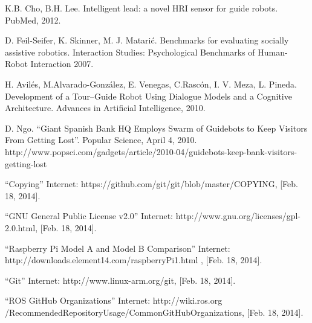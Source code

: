 \documentclass[11pt]{report}
\begin{document}
\begin{thebibliography}{99}

 K.B. Cho, B.H. Lee. Intelligent lead: a novel HRI sensor for guide robots. PubMed, 2012.

 D. Feil-Seifer, K. Skinner, M. J. Matarić. Benchmarks for evaluating socially assistive robotics. Interaction Studies: Psychological Benchmarks of Human-Robot Interaction 2007.

 H. Avilés, M.Alvarado-González, E. Venegas, C.Rascón, I. V. Meza, L. Pineda. Development of a Tour–Guide Robot Using Dialogue Models and a Cognitive Architecture. Advances in Artificial Intelligence, 2010.

 D. Ngo. “Giant Spanish Bank HQ Employs Swarm of Guidebots to Keep Visitors From Getting Lost”. Popular Science, April 4, 2010. http://www.popsci.com/gadgets/article/2010-04/guidebots-keep-bank-visitors-getting-lost

 “Copying” Internet: https://github.com/git/git/blob/master/COPYING, [Feb. 18, 2014].

 “GNU General Public License v2.0” Internet: http://www.gnu.org/licenses/gpl-2.0.html, [Feb. 18, 2014].

 “Raspberry Pi Model A and Model B Comparison” Internet: http://downloads.element14.com/raspberryPi1.html , [Feb. 18, 2014].

 “Git” Internet: http://www.linux-arm.org/git, [Feb. 18, 2014].

 “ROS GitHub Organizations” Internet: http://wiki.ros.org /RecommendedRepositoryUsage/CommonGitHubOrganizations, [Feb. 18, 2014].

 
\end{thebibliography}

\newpage
\end{document}
